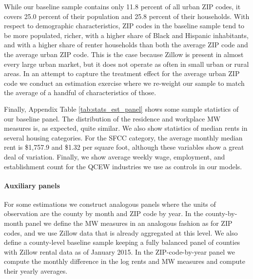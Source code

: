 While our baseline sample contains only 11.8 percent of all urban ZIP codes, it 
covers 25.0 percent of their population and 25.8 percent of their households.
With respect to demographic characteristics, ZIP codes in the baseline sample 
tend to be more populated, richer, with a higher share of Black and Hispanic 
inhabitants, and with a higher share of renter households than both 
the average ZIP code and the average urban ZIP code.
This is the case because Zillow is present in almost every large urban market, 
but it does not operate as often in small urban or rural areas.
In an attempt to capture the treatment effect for the average urban ZIP code 
we conduct an estimation exercise where we re-weight our sample to match the 
average of a handful of characteristics of those.

Finally, Appendix Table \ref{tab:stats_est_panel} shows some sample statistics 
of our baseline panel.
The distribution of the residence and workplace MW measures is, as expected,
quite similar.
We also show statistics of median rents in several housing categories.
For the SFCC category, the average monthly median rent is \$1,757.9 and \$1.32 
per square foot, although these variables show a great deal of variation.
Finally, we show average weekly wage, employment, and establishment count 
for the QCEW industries we use as controls in our models.

\paragraph{Auxiliary panels}

For some estimations we construct analogous panels where the units of 
observation are the county by month and ZIP code by year.
In the county-by-month panel we define the MW measures in an analogous fashion 
as for ZIP codes, and we use Zillow data that is already aggregated at this 
level.
We also define a county-level baseline sample keeping a fully balanced panel of 
counties with Zillow rental data as of January 2015.
In the ZIP-code-by-year panel we compute the monthly difference in the log rents 
and MW measures and compute their yearly averages.